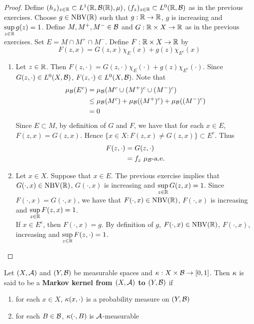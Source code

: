 \documentclass{book}
\begin{document}
	\begin{proof}
		Define $(h_z)_{z \in \mathbb{R}} \subset L^1(\mathbb{R}, \mathcal{B}(\mathbb{R}), \mu)$, $(f_z)_{z \in \mathbb{R}} \subset L^0(\mathbb{R}, \mathcal{B})$ as in the previous exercises. Choose $g \in \text{NBV}(\mathbb{R})$ such that $g: \mathbb{R} \rightarrow \mathbb{R}$, $g$ is increasing and $\sup\limits_{z \in \mathbb{R}} g(z) = 1$. Define $M, M^+, M^- \in \mathcal{B}$ and $G: \mathbb{R} \times X \rightarrow \mathbb{R}$ as in the previous exercises. Set $E = M \cap M^+ \cap M^-$. Define $F: \mathbb{R} \times X \rightarrow \mathbb{R}$ by 
		\[
		F(z, x) = G(z, x) \chi_{E}(x) + g(z) \chi_{E^c}(x)
		\]
		\begin{enumerate}
			\item Let $z \in \mathbb{R}$. Then $F(z, \cdot) = G(z, \cdot) \chi_{E}(\cdot) + g(z) \chi_{E^c}(\cdot)$. Since $G(z, \cdot) \in L^0(X, \mathcal{B})$, $F(z, \cdot) \in L^0(X, \mathcal{B})$. 
			Note that
			\begin{align*}
				\mu_{\mathcal{B}}(E^c)
				& = \mu_{\mathcal{B}}(M^c \cup (M^+)^c \cup (M^-)^c) \\  
				& \leq \mu_{\mathcal{B}}(M^c) + \mu_{\mathcal{B}}((M^+)^c) + \mu_{\mathcal{B}}((M^-)^c) \\
				& = 0
			\end{align*}
			Since $E \subset M$, by definition of $G$ and $F$, we have that for each $x \in E$, $F(z, x) = G(z, x)$. Hence $\{x \in X: F(z, x) \neq G(z, x)\} \subset E^c$. Thus 
			\begin{align*}
				F(z, \cdot) 
				& = G(z, \cdot) \\
				& = f_z \text{ $\mu_{\mathcal{B}}$-a.e.}
			\end{align*}
			\item Let $x \in X$. Suppose that $x \in E$. The previous exercise implies that $G(\cdot, x) \in \text{NBV}(\mathbb{R})$, $G(\cdot, x)$ is increasing and $\sup\limits_{z \in \mathbb{R}} G(z, x) = 1$. Since $F(\cdot, x) = G(\cdot, x)$, we have that $F(\cdot, x) \in \text{NBV}(\mathbb{R})$, $F(\cdot, x)$ is increasing and $\sup\limits_{z \in \mathbb{R}} F(z, x) = 1$. \\
			If $x \in E^c$, then $F(\cdot, x) = g$. By definition of $g$, $F(\cdot, x) \in \text{NBV}(\mathbb{R})$, $F(\cdot, x)$, increasing and $\sup\limits_{z \in \mathbb{R}} F(z, \cdot) = 1$.
		\end{enumerate}
	\end{proof}
	
	\begin{defn}
		Let $(X, \mathcal{A})$ and $(Y, \mathcal{B})$ be  measurable spaces and $\kappa: X \times \mathcal{B} \rightarrow [0,1]$. Then $\kappa$ is said to be a \textbf{Markov kernel from $(X, \mathcal{A})$ to $(Y, \mathcal{B})$} if 
		\begin{enumerate}
			\item for each $x \in X$, $\kappa(x, \cdot)$ is a probability measure on $(Y, \mathcal{B})$
			\item for each $B \in \mathcal{B}$, $\kappa(\cdot, B)$ is $\mathcal{A}$-measurable
		\end{enumerate}
	\end{defn}
\end{document}
